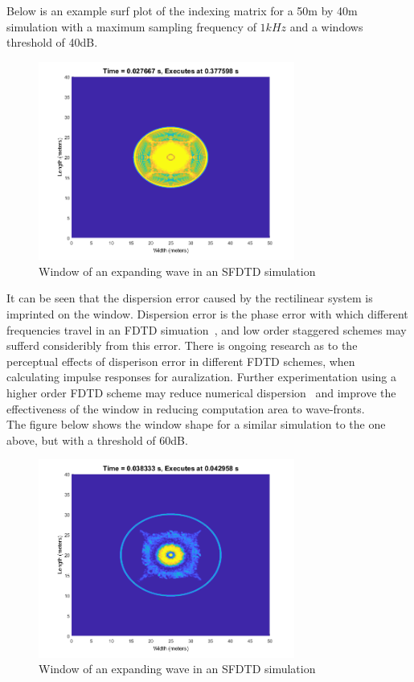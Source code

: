 Below is an example surf plot of the indexing matrix for a 50m by 40m simulation with a maximum sampling frequency of $1kHz$ and a windows threshold of 40dB. 
\begin{figure}[H]
\centering
  \includegraphics[width=0.75\textwidth]{./graphics/Example Window 1.png} %
  \caption{Window of an expanding wave in an SFDTD simulation}
\end{figure}
It can be seen that the dispersion error caused by the rectilinear system is imprinted on the window. Dispersion error is the phase error with which different frequencies travel in an FDTD simuation~\cite{Saarelma2016}, and low order staggered schemes may sufferd consideribly from this error. There is ongoing research as to the perceptual effects of disperison error in different FDTD schemes, when calculating impulse responses for auralization. Further experimentation using a higher order FDTD scheme may reduce numerical dispersion~\cite{Hamilton2013a,VanMourik2014} and improve the effectiveness of the window in reducing computation area to wave-fronts.\\

The figure below shows the window shape for a similar simulation to the one above, but with a threshold of 60dB.\\
\begin{figure}[H]
\centering
  \includegraphics[width=0.75\textwidth]{./graphics/Example Window 3 60 threshold.png}
  \caption{Window of an expanding wave in an SFDTD simulation}
\end{figure}

